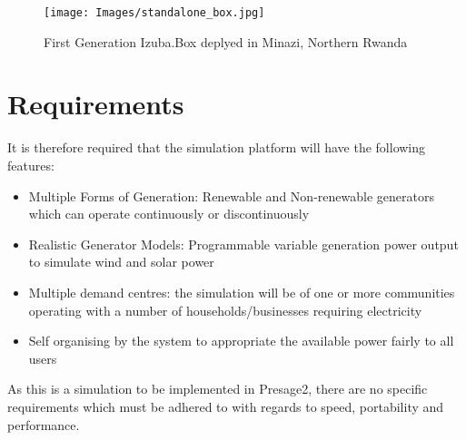 \documentclass{article}
\begin{document}
\begin{figure}[h!]
\centering
\texttt{[image: Images/standalone\_box.jpg]}
\caption{First Generation Izuba.Box deplyed in Minazi, Northern Rwanda}
\label{fig:IzubaBox}
\end{figure}




\section{Requirements}


It is therefore required that the simulation platform will have the following features:
\begin{itemize}
  \item Multiple Forms of Generation: Renewable and Non-renewable generators which can operate continuously or discontinuously
  \item Realistic Generator Models: Programmable variable generation power output to simulate wind and solar power
  \item Multiple demand centres: the simulation will be of one or more communities operating with a number of households/businesses requiring electricity
  \item Self organising by the system to appropriate the available power fairly to all users
\end{itemize}

As this is a simulation to be implemented in Presage2, there are no specific requirements which must be adhered to with regards to speed, portability and performance.  
\end{document}
